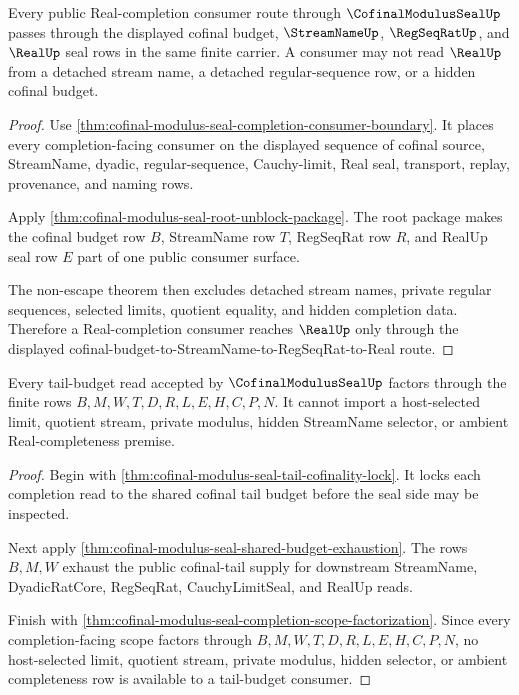 \begin{theorem}
\label{thm:cofinal-modulus-seal-streamname-real-consumer-route}
Every public Real-completion consumer route through $\CofinalModulusSealUp$ passes through the displayed cofinal budget, $\StreamNameUp$, $\RegSeqRatUp$, and $\RealUp$ seal rows in the same finite carrier. A consumer may not read $\RealUp$ from a detached stream name, a detached regular-sequence row, or a hidden cofinal budget.
\end{theorem}
\begin{proof}
Use \autoref{thm:cofinal-modulus-seal-completion-consumer-boundary}. It places every completion-facing consumer on the displayed sequence of cofinal source, StreamName, dyadic, regular-sequence, Cauchy-limit, Real seal, transport, replay, provenance, and naming rows.

Apply \autoref{thm:cofinal-modulus-seal-root-unblock-package}. The root package makes the cofinal budget row $B$, StreamName row $T$, RegSeqRat row $R$, and RealUp seal row $E$ part of one public consumer surface.

The non-escape theorem then excludes detached stream names, private regular sequences, selected limits, quotient equality, and hidden completion data. Therefore a Real-completion consumer reaches $\RealUp$ only through the displayed cofinal-budget-to-StreamName-to-RegSeqRat-to-Real route.
\end{proof}

\begin{theorem}
\label{thm:cofinal-modulus-seal-tail-budget-factorization}
Every tail-budget read accepted by $\CofinalModulusSealUp$ factors through the finite rows $B,M,W,T,D,R,L,E,H,C,P,N$. It cannot import a host-selected limit, quotient stream, private modulus, hidden StreamName selector, or ambient Real-completeness premise.
\end{theorem}
\begin{proof}
Begin with \autoref{thm:cofinal-modulus-seal-tail-cofinality-lock}. It locks each completion read to the shared cofinal tail budget before the seal side may be inspected.

Next apply \autoref{thm:cofinal-modulus-seal-shared-budget-exhaustion}. The rows $B,M,W$ exhaust the public cofinal-tail supply for downstream StreamName, DyadicRatCore, RegSeqRat, CauchyLimitSeal, and RealUp reads.

Finish with \autoref{thm:cofinal-modulus-seal-completion-scope-factorization}. Since every completion-facing scope factors through $B,M,W,T,D,R,L,E,H,C,P,N$, no host-selected limit, quotient stream, private modulus, hidden selector, or ambient completeness row is available to a tail-budget consumer.
\end{proof}

